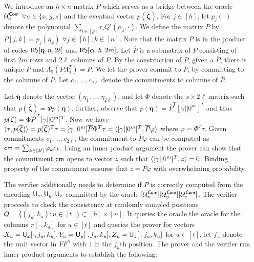  We introduce an $h\times n$ matrix $P$ which serves as a bridge between the oracle $\mathcal{U}^{\mathsf{Com}}_a$ $\forall a \in \{x,y,z\}$ and the eventual vector $p(\overline{\bm{\zeta}})$. For $j\in [h]$, let $p_j(\cdot)$ denote the polynomial $\sum_{i\in[p]} r_iQ^i(\alpha_j, \cdot)$. We define the matrix $P$ by $P[j,k]= p_j(\eta_k)$ $\forall j\in[h], k\in[n]$. Note that the matrix $P$ is in the product of codes $\mathsf{RS}[\bm{\eta},n,2\ell]$ and $\mathsf{RS}[\bm{\alpha},h,2m]$. Let $\overline{P}$ is a submatrix of $P$ consisting of first $2m$ rows and $2\ell$ columns of $P$. By the construction of $P$, given a $\overline{P}$, there is unique $P$ and $\Lambda_5( \overline{P}\Lambda_4^T) = P$. We let the prover commit to $P$, by committing to the columns of $\overline{P}$. Let $c_1, \ldots, c_{2\ell}$ denote the commitments to columns of $\overline{P}$.

 Let $\overline{\bm{\eta}}$ denote the vector $(\eta_1, \ldots, \eta_{2\ell})$, and let $\Phi$ denote the $s\times 2\ell$ matrix such that $p(\overline{\bm{\zeta}}) = \Phi p(\overline{\bm{\eta}})$. further, observe that $p(\overline{\bm{\eta}}) = \overline{P}^T [\gamma||0^m]^T$ and thus $p(\overline{\bm{\zeta}}) = \Phi \overline{P}^T [\gamma||0^m]^T$. Now we have $\langle \tau,p(\overline{\bm{\zeta}})\rangle = p(\overline{\bm{\zeta}})^T \tau = [\gamma||0^m] \overline{P} \Phi^T \tau = \langle [\gamma||0^m]^T,\overline{P}\varphi\rangle$ where $\varphi = \Phi^T \tau$. Given commitments $c_1, \ldots, c_{2\ell}$, the commitment to $\overline{P}\varphi$ can be computed as $\mathsf{cm} = \sum_{k\in[2\ell]} \varphi_k c_k$. Using an inner product argument the prover can show that the commitment $\mathsf{cm}$ opens to vector $z$ such that $\langle [\gamma||0^m]^T,z\rangle = 0$. Binding property of the commitment ensures that $z = \overline{P}\varphi$ with overwhelming probability.

 The verifier additionally needs to determine if $P$ is correctly computed from the encoding $\mathsf{U}_x, \mathsf{U}_y, \mathsf{U}_z$ committed by the oracle $[\mathcal{U}^{\mathsf{Com}}_x||\mathcal{U}^{\mathsf{Com}}_y||\mathcal{U}^{\mathsf{Com}}_z]$. The verifier proceeds to check the consistency at randomly sampled positions $Q=\{(j_u,k_u) : u\in[t] \} \subset [h]\times[n]$. It queries the oracle the oracle for the columns $\pi[\cdot, k_u]$  for $u\in[t]$ and queries the prover for vectors $X_u = \mathsf{U}_x[\cdot,j_u,k_u], Y_u = \mathsf{U}_y[\cdot, j_u,k_u], Z_u = \mathsf{U}_z[\cdot,j_u,k_u]$ for $u\in [t]$, let $f_u$ denote the unit vector in $FF^h$ with 1 in the $j_u$th position. The prover and the verifier run inner product arguments to establish the following: 


